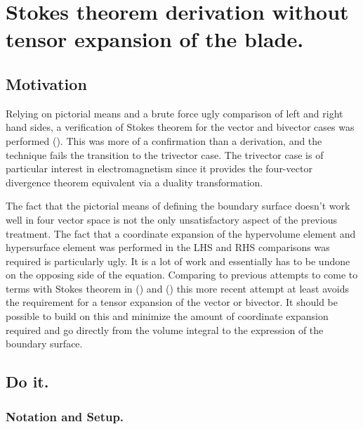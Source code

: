 

\usepackage{txfonts}

\chapter{Stokes theorem derivation without tensor expansion of the blade.}
\label{chap:stokesNoTensor}
\date{July 21, 2009}

\beginArtWithToc

\section{Motivation}

Relying on pictorial means and a brute force ugly comparison of left and right hand sides, a verification of Stokes theorem for the vector and bivector cases was performed (\cite{stokesGradeTwo}).  This was more of a confirmation than a derivation, and the technique fails the transition to the trivector case.  The trivector case is of particular interest in electromagnetism since it provides the four-vector divergence theorem equivalent via a duality transformation.

The fact that the pictorial means of defining the boundary surface doesn't work well in four vector space is not the only unsatisfactory aspect of the previous treatment.  The fact that a coordinate expansion of the hypervolume element and hypersurface element was performed in the LHS and RHS comparisons was required is particularly ugly.  It is a lot of work and essentially has to be undone on the opposing side of the equation.  Comparing to previous attempts to come to terms with Stokes theorem in (\cite{PJStokes1}) and (\cite{PJStokes2}) this more recent attempt at least avoids the requirement for a tensor expansion of the vector or bivector.  It should be possible to build on this and minimize the amount of coordinate expansion required and go directly from the volume integral to the expression of the boundary surface.

\section{Do it.}
\subsection{Notation and Setup.}

